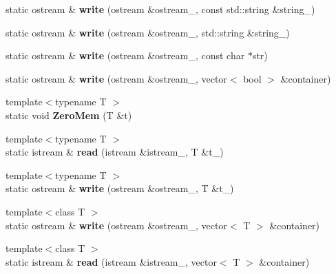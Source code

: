 \begin{DoxyCompactItemize}
\item 
\mbox{\label{classserialize_a1a5216f4e26943f3706768f3503953ed}} 
static ostream \& {\bfseries write} (ostream \&ostream\+\_\+, const std\+::string \&string\+\_\+)
\item 
\mbox{\label{classserialize_ac145e93c816fd1828e06341bcdf158f5}} 
static ostream \& {\bfseries write} (ostream \&ostream\+\_\+, std\+::string \&string\+\_\+)
\item 
\mbox{\label{classserialize_a0ee7cec24d516020dc3bc312dced3fbe}} 
static ostream \& {\bfseries write} (ostream \&ostream\+\_\+, const char $\ast$str)
\item 
\mbox{\label{classserialize_a36cdd68fcfac62ff04531c92697ddc15}} 
static ostream \& {\bfseries write} (ostream \&ostream\+\_\+, vector$<$ bool $>$ \&container)
\item 
\mbox{\label{classserialize_a314f203661ac9b44fdde84679a282cd6}} 
{\footnotesize template$<$typename T $>$ }\\static void {\bfseries Zero\+Mem} (T \&t)
\item 
\mbox{\label{classserialize_a320136a20f918b624dec9d5957662c5d}} 
{\footnotesize template$<$typename T $>$ }\\static istream \& {\bfseries read} (istream \&istream\+\_\+, T \&t\+\_\+)
\item 
\mbox{\label{classserialize_a1fbd07f28ae10549a90ff7e82de7a74c}} 
{\footnotesize template$<$typename T $>$ }\\static ostream \& {\bfseries write} (ostream \&ostream\+\_\+, T \&t\+\_\+)
\item 
\mbox{\label{classserialize_a45020fbd693acf144c1b391b945118d5}} 
{\footnotesize template$<$class T $>$ }\\static ostream \& {\bfseries write} (ostream \&ostream\+\_\+, vector$<$ T $>$ \&container)
\item 
\mbox{\label{classserialize_afde35e0b366adf2f5b084c270dc84411}} 
{\footnotesize template$<$class T $>$ }\\static istream \& {\bfseries read} (istream \&istream\+\_\+, vector$<$ T $>$ \&container)

\end{DoxyCompactItemize}
